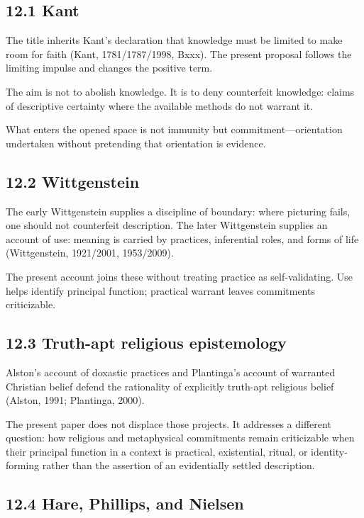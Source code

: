 \documentclass[
  11pt,
]{article}
\begin{document}
\subsection{12.1 Kant}\label{kant}

The title inherits Kant's declaration that knowledge must be limited to
make room for faith (Kant, 1781/1787/1998, Bxxx). The present proposal
follows the limiting impulse and changes the positive term.

The aim is not to abolish knowledge. It is to deny counterfeit
knowledge: claims of descriptive certainty where the available methods
do not warrant it.

What enters the opened space is not immunity but
commitment---orientation undertaken without pretending that orientation
is evidence.

\subsection{12.2 Wittgenstein}\label{wittgenstein}

The early Wittgenstein supplies a discipline of boundary: where
picturing fails, one should not counterfeit description. The later
Wittgenstein supplies an account of use: meaning is carried by
practices, inferential roles, and forms of life (Wittgenstein,
1921/2001, 1953/2009).

The present account joins these without treating practice as
self-validating. Use helps identify principal function; practical
warrant leaves commitments criticizable.

\subsection{12.3 Truth-apt religious
epistemology}\label{truth-apt-religious-epistemology}

Alston's account of doxastic practices and Plantinga's account of
warranted Christian belief defend the rationality of explicitly
truth-apt religious belief (Alston, 1991; Plantinga, 2000).

The present paper does not displace those projects. It addresses a
different question: how religious and metaphysical commitments remain
criticizable when their principal function in a context is practical,
existential, ritual, or identity-forming rather than the assertion of an
evidentially settled description.

\subsection{12.4 Hare, Phillips, and
Nielsen}\label{hare-phillips-and-nielsen}
\end{document}
